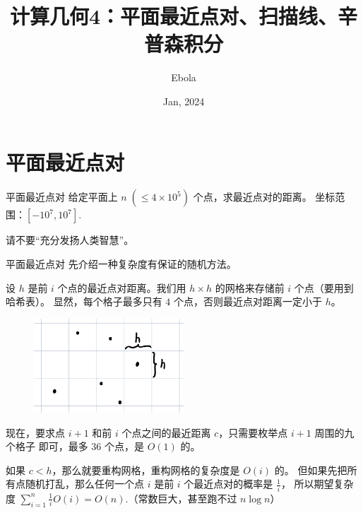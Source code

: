 \documentclass{beamer}
\author{Ebola}
\title{计算几何4：平面最近点对、扫描线、辛普森积分}
\institute{
    Institute of Mathematics, \\
    Zhejiang University.
}
\date{Jan, 2024}
\begin{document}
\begin{frame}
    \titlepage
\end{frame}

\begin{frame}
    \tableofcontents[sectionstyle=show,subsectionstyle=show/shaded/hide,subsubsectionstyle=show/shaded/hide]
\end{frame}

\section{平面最近点对}

\begin{frame}{平面最近点对}
    \small 
    给定平面上 $n\;(\leq 4\times 10^5)$ 个点，求最近点对的距离。
    坐标范围：$[-10^7,10^7]$.

    \vspace{1em}
    请不要“充分发扬人类智慧”。
\end{frame}

\begin{frame}{平面最近点对}
    \footnotesize
    先介绍一种复杂度有保证的随机方法。

    \vspace{.5em}\pause
    设 $h$ 是前 $i$ 个点的最近点对距离。我们用 $h\times h$ 的网格来存储前 $i$ 个点（要用到哈希表）。
    显然，每个格子最多只有 $4$ 个点，否则最近点对距离一定小于 $h$。

    \begin{figure}[H]
        \centering
        \includegraphics[width=0.5\textwidth]{pic/grid.jpg}
    \end{figure}

    现在，要求点 $i+1$ 和前 $i$ 个点之间的最近距离 $c$，只需要枚举点 $i+1$ 周围的九个格子
    即可，最多 $36$ 个点，是 $O(1)$ 的。

    \vspace{.5em}\pause
    如果 $c<h$，那么就要重构网格，重构网格的复杂度是 $O(i)$ 的。
    但如果先把所有点随机打乱，那么任何一个点 $i$ 是前 $i$ 个最近点对的概率是 $\frac{1}{i}$，
    所以期望复杂度 $\sum_{i=1}^n \frac{1}{i}O(i)=O(n)$.（常数巨大，甚至跑不过 $n\log n$）
\end{frame}
\end{document}
